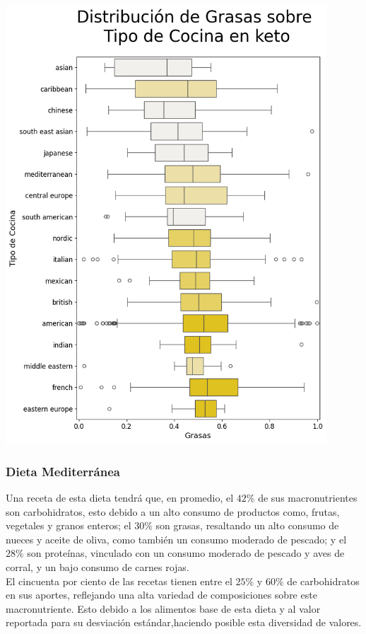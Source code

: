 \documentclass[12pt,a4paper]{article}
\begin{document}
            \begin{center}
                \includegraphics[width=0.90\textwidth]{Resources/2_03_plot_02_3.png}
            \end{center}

        \subsubsection{Dieta Mediterránea}

            Una receta de esta dieta tendrá que, en promedio, el $42\%$ de sus 
            macronutrientes son carbohidratos, esto debido a un alto consumo de 
            productos como, frutas, vegetales y granos enteros; el $30\%$ son 
            grasas, resaltando un alto consumo de nueces y aceite de oliva, como 
            también un consumo moderado de pescado; y el $28\%$ son proteínas, 
            vinculado con un consumo moderado de pescado y aves de corral, y un 
            bajo consumo de carnes rojas.\\

            El cincuenta por ciento de las recetas tienen entre el $25\%$ y $60\%$ 
            de carbohidratos en sus aportes, reflejando una alta variedad de composiciones 
            sobre este macronutriente. Esto debido a los alimentos base de esta dieta y 
            al valor reportada para su desviación estándar,haciendo posible esta 
            diversidad de valores.\\
\end{document}
